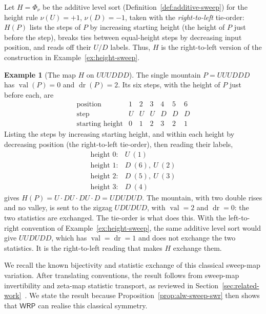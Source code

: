 \documentclass[11pt]{article}
\theoremstyle{definition}
\newtheorem{example}[theorem]{Example}
\newcommand{\WRP}{\mathsf{WRP}}
\newcommand{\val}{\operatorname{val}}
\newcommand{\dr}{\operatorname{dr}}
\begin{document}
Let $H=\Phi_\nu$ be the additive level sort
(Definition~\ref{def:additive-sweep}) for the height rule $\nu(U)=+1$,
$\nu(D)=-1$, taken with the \emph{right-to-left} tie-order: $H(P)$ lists the
steps of $P$ by increasing starting height (the height of $P$ just before the
step), breaks ties between equal-height steps by decreasing input position, and
reads off their $U/D$ labels.  Thus, $H$ is the right-to-left version of the
construction in Example~\ref{ex:height-sweep}.

\begin{example}[The map $H$ on $UUUDDD$]\label{ex:narayana-sweep}
The single mountain $P=UUUDDD$ has $\val(P)=0$ and $\dr(P)=2$.  Its six steps,
with the height of $P$ just before each, are
\[
   \begin{array}{c|cccccc}
     \text{position}        & 1 & 2 & 3 & 4 & 5 & 6\\\hline
     \text{step}            & U & U & U & D & D & D\\
     \text{starting height} & 0 & 1 & 2 & 3 & 2 & 1
   \end{array}
\]
Listing the steps by increasing starting height, and within each height by
decreasing position (the right-to-left tie-order), then reading their labels,
\[
   \begin{array}{r|l}
     \text{height }0: & U\ (1)\\
     \text{height }1: & D\ (6),\ U\ (2)\\
     \text{height }2: & D\ (5),\ U\ (3)\\
     \text{height }3: & D\ (4)
   \end{array}
\]
gives $H(P)=U\cdot DU\cdot DU\cdot D=UDUDUD$.  The mountain, with two double
rises and no valley, is sent to the zigzag $UDUDUD$, with $\val=2$ and $\dr=0$:
the two statistics are exchanged.  The tie-order is what does this.  With the
left-to-right convention of Example~\ref{ex:height-sweep}, the same additive
level sort would give $UUDUDD$, which has $\val=\dr=1$ and does not exchange the
two statistics.  It is the right-to-left reading that makes $H$ exchange them.
\end{example}

We recall the known bijectivity and statistic exchange of this classical
sweep-map variation.  After translating conventions, the result follows from
sweep-map invertibility and zeta-map statistic transport, as reviewed in
Section~\ref{sec:related-work}~\cite{ArmstrongLoehrWarrington2015,
ThomasWilliams2018,CeballosFangMuhle2020,SulzgruberThiel2018}.  We state the
result because Proposition~\ref{prop:alw-sweep-swr} then shows that $\WRP$ can
realise this classical symmetry.
\end{document}

